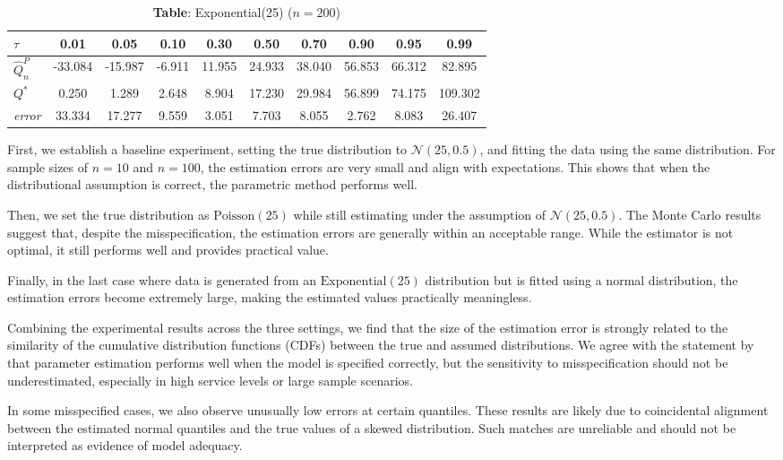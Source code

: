 \begin{table}[H]
\centering
\caption{\textbf{Table}: Exponential(25) ($n=200$)}
\label{tab:exp_n200}
\renewcommand{\arraystretch}{1.15}
\begin{tabular}{lccccccccc}
\toprule
$\tau$         & 0.01 & 0.05 & 0.10 & 0.30 & 0.50 & 0.70 & 0.90 & 0.95 & 0.99 \\ \midrule
$\hat{Q}_n^P$  & -33.084 & -15.987 & -6.911 & 11.955 & 24.933 & 38.040 & 56.853 & 66.312 & 82.895 \\
$Q^*$          &   0.250 &   1.289 &  2.648 &  8.904 & 17.230 & 29.984 & 56.899 & 74.175 & 109.302 \\
\textit{error} &  33.334 &  17.277 &  9.559 &  3.051 &  7.703 &  8.055 &  2.762 &  8.083 &  26.407 \\ \bottomrule
\end{tabular}
\end{table}


First, we establish a baseline experiment, setting the true distribution to $\mathcal{N}(25, 0.5)$, and fitting the data using the same distribution. For sample sizes of $n = 10$ and $n = 100$, the estimation errors are very small and align with expectations. This shows that when the distributional assumption is correct, the parametric method performs well.

Then, we set the true distribution as $\text{Poisson}(25)$ while still estimating under the assumption of $\mathcal{N}(25, 0.5)$. The Monte Carlo results suggest that, despite the misspecification, the estimation errors are generally within an acceptable range. While the estimator is not optimal, it still performs well and provides practical value.

Finally, in the last case where data is generated from an $\text{Exponential}(25)$ distribution but is fitted using a normal distribution, the estimation errors become extremely large, making the estimated values practically meaningless.

Combining the experimental results across the three settings, we find that the size of the estimation error is strongly related to the similarity of the cumulative distribution functions (CDFs) between the true and assumed distributions. We agree with the statement by \citet{levi2015} that parameter estimation performs well when the model is specified correctly, but the sensitivity to misspecification should not be underestimated, especially in high service levels or large sample scenarios.

In some misspecified cases, we also observe unusually low errors at certain quantiles. These results are likely due to coincidental alignment between the estimated normal quantiles and the true values of a skewed distribution. Such matches are unreliable and should not be interpreted as evidence of model adequacy.
